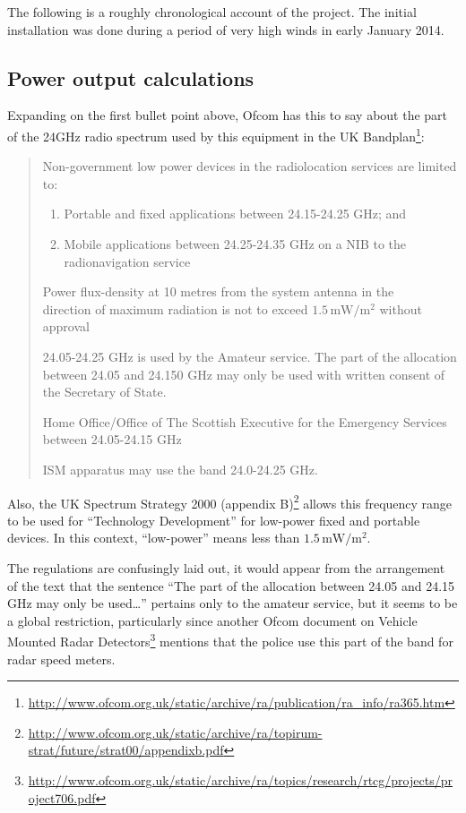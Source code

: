 The following is a roughly chronological account of the project.
The initial installation was done during a period of very high winds
in early January 2014.

\subsection{Power output calculations}

Expanding on the first bullet point above,
Ofcom has this to say about the part
of the 24GHz radio spectrum used by this equipment in the
UK Bandplan\footnote{\url{http://www.ofcom.org.uk/static/archive/ra/publication/ra_info/ra365.htm}}:

\begin{quotation}
  Non-government low power devices in the radiolocation services are
  limited to:
  \begin{enumerate}
  \item Portable and fixed applications between 24.15-24.25 GHz; and
  \item Mobile applications between 24.25-24.35 GHz on a NIB to the
    radionavigation service
  \end{enumerate}

  Power flux-density at 10 metres from the system antenna in the\\
  direction of maximum radiation is not to exceed $1.5\,\text{mW}/\text{m}^2$
  without approval

  24.05-24.25 GHz is used by the Amateur service. The part of the
  allocation between 24.05 and 24.150 GHz may only be used with
  written consent of the Secretary of State.

  Home Office/Office of The Scottish Executive for the Emergency
  Services between 24.05-24.15 GHz

  ISM apparatus may use the band 24.0-24.25 GHz.
\end{quotation}

Also, the UK
Spectrum Strategy 2000 (appendix
B)\footnote{\url{http://www.ofcom.org.uk/static/archive/ra/topirum-strat/future/strat00/appendixb.pdf}}
allows this frequency range to be
used for ``Technology Development'' for low-power fixed and portable
devices. In this context, ``low-power'' means less than
$1.5\,\text{mW}/\text{m}^2$.

The regulations are confusingly laid out, it would appear from
the arrangement of the text that the sentence ``The part of the
allocation between 24.05 and 24.15 GHz may only be used\ldots{}''
pertains only to the amateur service, but it seems to be a global
restriction, particularly since another Ofcom document on
Vehicle Mounted Radar
Detectors\footnote{\url{http://www.ofcom.org.uk/static/archive/ra/topics/research/rtcg/projects/project706.pdf}}
mentions that the police use this part of the
band for radar speed meters.

